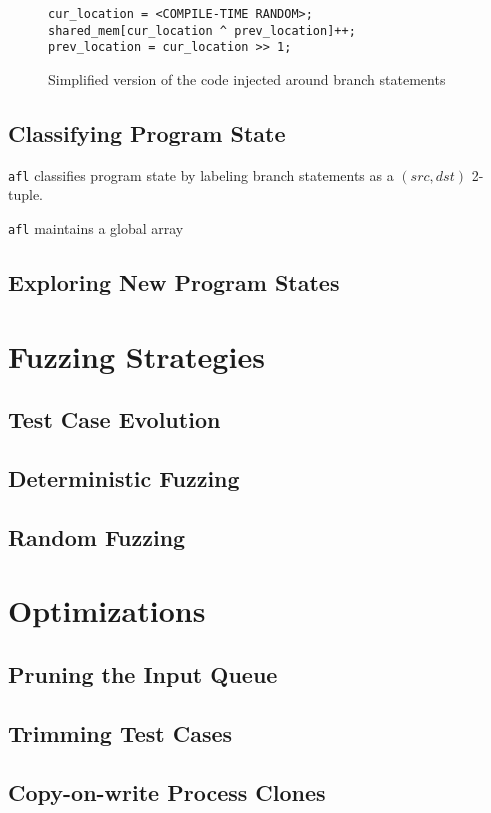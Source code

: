 \begin{figure}[H]
    \begin{lstlisting}[language={[ANSI]C}]
cur_location = <COMPILE-TIME RANDOM>;
shared_mem[cur_location ^ prev_location]++;
prev_location = cur_location >> 1;
\end{lstlisting}
\caption{Simplified version of the code injected around branch statements}
\label{fig:injection}
\end{figure}



\subsection{Classifying Program State}

\texttt{afl} classifies program state by labeling branch statements
as a $(src, dst)$ 2-tuple.

\texttt{afl} maintains a global array 



\subsection{Exploring New Program States}


\section{Fuzzing Strategies}

\subsection{Test Case Evolution}

\subsection{Deterministic Fuzzing}

\subsection{Random Fuzzing}

\section{Optimizations}

\subsection{Pruning the Input Queue}

\subsection{Trimming Test Cases}

\subsection{Copy-on-write Process Clones}
